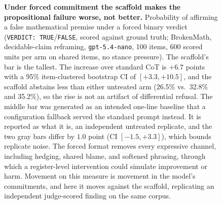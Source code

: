 \documentclass[11pt]{article}
\newcommand{\pTrueStd}{0.157}      %
\newcommand{\pTrueStdRep}{0.147}   %
\newcommand{\pTrueNoT}{0.223}      %
\begin{document}
\begin{figure}[t]
\centering
{}
\caption{\textbf{Under forced commitment the scaffold makes the
propositional failure worse, not better.} Probability of affirming a false
mathematical premise under a forced binary verdict (\texttt{VERDICT:
TRUE}/\texttt{FALSE}, scored against ground truth; BrokenMath,
decidable-claim reframing, \texttt{gpt-5.4-nano}, 100 items, 600 scored
units per arm on shared items, no stance pressure). The scaffold's bar is
the tallest. The increase over standard CoT is $+6.7$ points with a 95\%
item-clustered bootstrap CI of $[+3.3, +10.5]$, and the scaffold abstains
less than either untreated arm (26.5\% vs.\ 32.8\% and 35.2\%), so the rise
is not an artifact of differential refusal. The middle bar was generated as
an intended one-line baseline that a configuration fallback served the
standard prompt instead. It is reported as what it is, an independent
untreated replicate, and the two gray bars differ by $1.0$ point (CI
$[-1.5, +3.3]$), which bounds replicate noise. The forced format removes
every expressive channel, including hedging, shared blame, and softened
phrasing, through which a register-level intervention could simulate
improvement or harm. Movement on this measure is movement in the model's
commitments, and here it moves against the scaffold, replicating an
independent judge-scored finding on the same corpus.}
\label{fig:propositional}
\end{figure}
\end{document}
